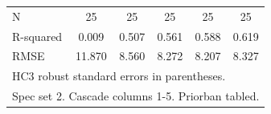 \begin{table}[htbp]
\begin{tabular}{l*{5}{c}}
\midrule
N           &          25   &          25   &          25   &          25   &          25   \\
R-squared   &       0.009   &       0.507   &       0.561   &       0.588   &       0.619   \\
RMSE        &      11.870   &       8.560   &       8.272   &       8.207   &       8.327   \\
\bottomrule
\multicolumn{6}{l}{\footnotesize HC3 robust standard errors in parentheses.}\\
\multicolumn{6}{l}{\footnotesize Spec set 2. Cascade columns 1-5. Priorban tabled.}\\
\end{tabular}
\end{table}
